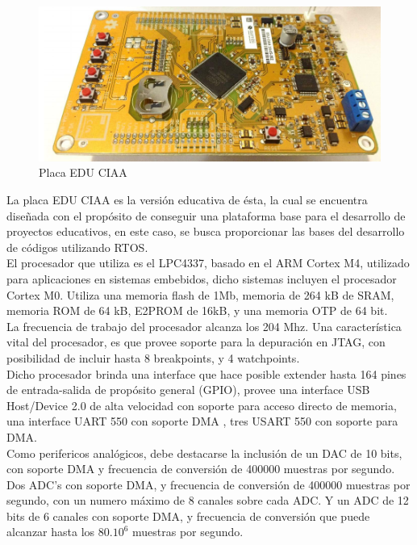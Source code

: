 \documentclass[12pt,letterpaper]{article}
\begin{document}
\begin{center}
\begin{figure}[!h]
\centering
\includegraphics[width=10 cm]{figuras/descripcion1.png}
\caption{Placa EDU CIAA}
\label{Fig_placa}
\end{figure}
\end{center}


La placa EDU CIAA es la versión educativa de ésta, la cual se encuentra diseñada con el propósito de conseguir una plataforma base para el desarrollo de proyectos educativos, en este caso, se busca proporcionar las bases del desarrollo de códigos utilizando RTOS.
  \\

El procesador que utiliza es el LPC4337, basado en el  ARM Cortex M4, utilizado para aplicaciones en sistemas embebidos, dicho sistemas incluyen el procesador Cortex M0. Utiliza una memoria flash de 1Mb, memoria de 264 kB de SRAM, memoria ROM de 64 kB, E2PROM de 16kB, y una memoria OTP de 64 bit.
  \\

La frecuencia de trabajo del procesador alcanza los 204 Mhz. Una característica vital del procesador, es que provee soporte para la depuración en JTAG, con posibilidad de incluir hasta 8 breakpoints, y 4 watchpoints.
  \\

Dicho procesador brinda una interface que hace posible extender hasta 164 pines de entrada-salida de propósito general (GPIO), provee una interface USB Host/Device 2.0 de alta velocidad con soporte para acceso directo de memoria, una interface UART 550 con soporte DMA , tres USART 550 con soporte para DMA\cite{descripcionenhojadatos}.
  \\

Como perifericos analógicos, debe destacarse la inclusión de un DAC de 10 bits, con soporte DMA y frecuencia de conversión de 400000 muestras por segundo. Dos ADC's con soporte DMA, y frecuencia de conversión de 400000 muestras por segundo, con un numero máximo de 8 canales sobre cada ADC. Y un ADC de 12 bits de 6 canales con soporte DMA, y frecuencia de conversión que puede alcanzar hasta los $80 . 10^6$ muestras por segundo.
  \\
\end{document}
